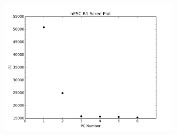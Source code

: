 \begin{figure}
  \centering

  \begin{subfigure}[b]{0.45\textwidth}
    \centering
    \includegraphics[width=\textwidth]{./fig/supplementary/hESC-R1-scree.png}\label{fig:hESCScree}
  \end{subfigure}

\end{figure}
